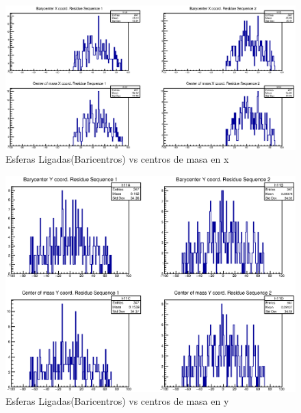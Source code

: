 \begin{figure}[htbp]
    \centering
    \includegraphics[width=1\linewidth]{./Figures/can1.eps}
    \caption[Esferas Ligadas(Baricentros) vs centros de masa en x]{Esferas Ligadas(Baricentros) vs centros de masa en x} %
    \label{fig:canx}
\end{figure}

\begin{figure}[htbp]
    \centering
    \includegraphics[width=1\linewidth]{./Figures/can2.eps}
    \caption[Esferas Ligadas(Baricentros) vs centros de masa en y]{Esferas Ligadas(Baricentros) vs centros de masa en y}
    \label{fig:cany}
\end{figure}

